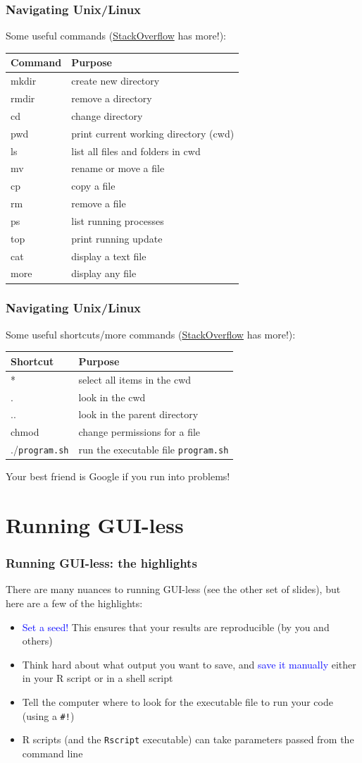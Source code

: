 \documentclass[12pt, 
hyperref={colorlinks=true, linkcolor=blue, urlcolor=cyan}]{beamer}
\newcommand{\myframe}[1]{\begin{frame} \frametitle{#1}}
\begin{document}
\myframe{Navigating Unix/Linux}
Some useful commands (\href{http://stackoverflow.com/}{StackOverflow} has more!):

\begin{tabular}{|l|l|}
Command & Purpose \\
\hline
mkdir & create new directory \\
rmdir & remove a directory \\
cd & change directory \\
pwd & print current working directory (cwd) \\
ls & list all files and folders in cwd \\
mv & rename or move a file \\
cp & copy a file \\
rm & remove a file \\
ps & list running processes \\
top & print running update\\
cat & display a text file \\
more & display any file
\end{tabular}
\end{frame}

\myframe{Navigating Unix/Linux}
Some useful shortcuts/more commands (\href{http://stackoverflow.com/}{StackOverflow} has more!):

\begin{tabular}{|l|l|}
Shortcut & Purpose \\
\hline
* & select all items in the cwd \\
. & look in the cwd \\
.. & look in the parent directory \\
chmod & change permissions for a file \\
./\texttt{program.sh} & run the executable file \texttt{program.sh}
\end{tabular}

Your best friend is Google if you run into problems!

\end{frame}

\section{Running GUI-less}
\myframe{Running GUI-less: the highlights}
There are many nuances to running GUI-less (see the other set of slides), but here are a few of the highlights:
\begin{itemize}
\item \textcolor{blue}{Set a seed!} This ensures that your results are reproducible (by you and others)
\item Think hard about what output you want to save, and \textcolor{blue}{save it manually} either in your R script or in a shell script
\item Tell the computer where to look for the executable file to run your code (using a \texttt{\#!})
\item R scripts (and the \texttt{Rscript} executable) can take parameters passed from the command line
\end{itemize}
\end{frame}
\end{document}
